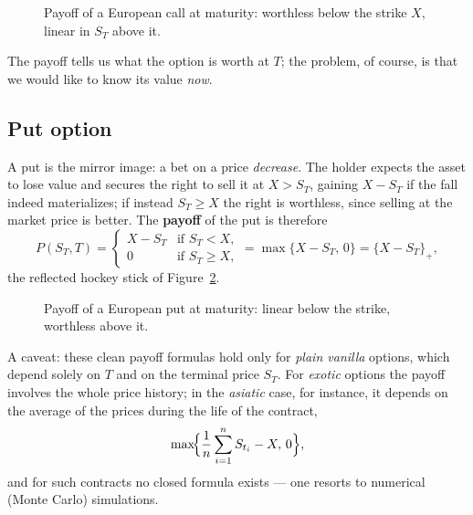 \begin{figure}[h!]
\centering
{}
\caption{Payoff of a European call at maturity: worthless below the strike $X$, linear in $S_T$ above it.}
\label{fig:call-payoff}
\end{figure}

The payoff tells us what the option is worth at $T$; the problem, of course, is that we would like to know its value \emph{now}.

\subsection{Put option}

A put is the mirror image: a bet on a price \emph{decrease}.
The holder expects the asset to lose value and secures the right to sell it at $X > S_T$, gaining $X - S_T$ if the fall indeed materializes; if instead $S_T \ge X$ the right is worthless, since selling at the market price is better.
The \textbf{payoff} of the put is therefore
\begin{equation}\label{eq:put-payoff}
P(S_T, T) = \begin{cases} X - S_T & \text{if } S_T < X, \\ 0 & \text{if } S_T \ge X, \end{cases} = \max\{X - S_T,\, 0\} = \{X - S_T\}_+,
\end{equation}
the reflected hockey stick of Figure~\ref{fig:put-payoff}.

\begin{figure}[h!]
\centering
{}
\caption{Payoff of a European put at maturity: linear below the strike, worthless above it.}
\label{fig:put-payoff}
\end{figure}

A caveat: these clean payoff formulas hold only for \emph{plain vanilla} options, which depend solely on $T$ and on the terminal price $S_T$.
For \emph{exotic} options the payoff involves the whole price history; in the \emph{asiatic} case, for instance, it depends on the average of the prices during the life of the contract,
\begin{equation}
\max\!\Bigl\{\frac{1}{n}\sum_{i=1}^{n}S_{t_i} - X,\, 0\Bigr\},
\end{equation}
and for such contracts no closed formula exists --- one resorts to numerical (Monte Carlo) simulations.


